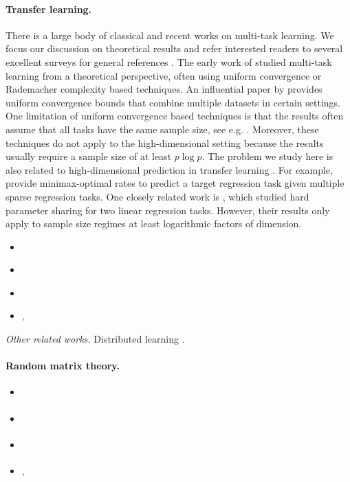 \paragraph{Transfer learning.}
There is a large body of classical and recent works on multi-task learning.
We focus our discussion on theoretical results and refer interested readers to several excellent surveys for general references \cite{PY09,ZY17,V20}.
The early work of \cite{B00,BS03,M06} studied multi-task learning from a theoretical perspective, often using uniform convergence or Rademacher complexity based techniques.
An influential paper by \cite{BBCK10} provides uniform convergence bounds that combine multiple datasets in certain settings.
One limitation of uniform convergence based techniques is that the results often assume that all  tasks have the same sample size, see e.g. \cite{B00,MPR16}.
Moreover, these techniques do not apply to the high-dimensional setting because the results usually require a sample size of at least $p \log p$.
The problem we study here is also related to high-dimensional prediction in transfer learning \cite{li2020transfer,bastani2020predicting}.
For example, \cite{li2020transfer} provide minimax-optimal rates to predict a target regression task given multiple sparse regression tasks.
\citet{tian2021transfer}
One closely related work is \cite{WZR20}, which studied hard parameter sharing for two linear regression tasks.
However, their results only apply to sample size regimes at least logarithmic factors of dimension.
\begin{itemize}
	\item \citet{lei2021nearoptimal}
	\item \citet{kalan2020minimax}
	\item \citet{cao2019learning}
	\item \citet{hanneke2020value,hanneke2020no}, \citet{cai2021transfer}
\end{itemize}
\textit{Other related works.} Distributed learning \cite{dobriban2018high}.
\citet{chen2021weighted}

\paragraph{Random matrix theory.}
\begin{itemize}
	\item \citet{hastie2019surprises}
	\item \citet{bartlett2020benign}
	\item \citet{liang2020just}
	\item \citet{montanari2019generalization}, \citet{liang2020precise}
\end{itemize}

